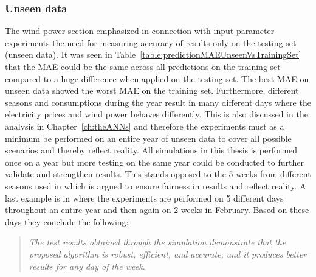 \subsubsection{Unseen data}
\label{sec:unseenDataDiscussion}
The wind power section emphasized in connection with input parameter experiments the need for measuring accuracy of results only on the testing set (unseen data). It was seen in Table~\ref{table:predictionMAEUnseenVsTrainingSet} that the MAE could be the same across all predictions on the training set compared to a huge difference when applied on the testing set. The best MAE on unseen data showed the worst MAE on the training set. Furthermore, different seasons and consumptions during the year result in many different days where the electricity prices and wind power behaves differently. This is also discussed in the analysis in Chapter~\ref{ch:theANNs} and therefore the experiments must as a minimum be performed on an entire year of unseen data to cover all possible scenarios and thereby reflect reality. All simulations in this thesis is performed once on a year but more testing on the same year could be conducted to further validate and strengthen results. This stands opposed to the 5 weeks from different seasons used in \cite{1} which is argued to ensure fairness in results and reflect reality. A last example is in \cite{pjmForecast} where the experiments are performed on 5 different days throughout an entire year and then again on 2 weeks in February. Based on these days they conclude the following:

\begin{quotation}
\textit{The test results obtained through the simulation demonstrate that the proposed algorithm is robust, efficient, and accurate, and it produces better results for any day of the week.}
\end{quotation}

